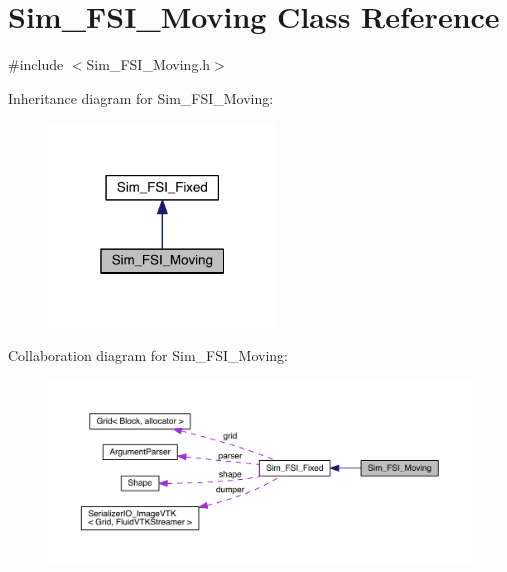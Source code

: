 \hypertarget{class_sim___f_s_i___moving}{}\section{Sim\+\_\+\+F\+S\+I\+\_\+\+Moving Class Reference}
\label{class_sim___f_s_i___moving}


{\ttfamily \#include $<$Sim\+\_\+\+F\+S\+I\+\_\+\+Moving.\+h$>$}



Inheritance diagram for Sim\+\_\+\+F\+S\+I\+\_\+\+Moving\+:\nopagebreak
\begin{figure}[H]
\begin{center}
\leavevmode
\includegraphics[width=172pt]{d7/d58/class_sim___f_s_i___moving__inherit__graph}
\end{center}
\end{figure}


Collaboration diagram for Sim\+\_\+\+F\+S\+I\+\_\+\+Moving\+:\nopagebreak
\begin{figure}[H]
\begin{center}
\leavevmode
\includegraphics[width=350pt]{d2/d99/class_sim___f_s_i___moving__coll__graph}
\end{center}
\end{figure}

